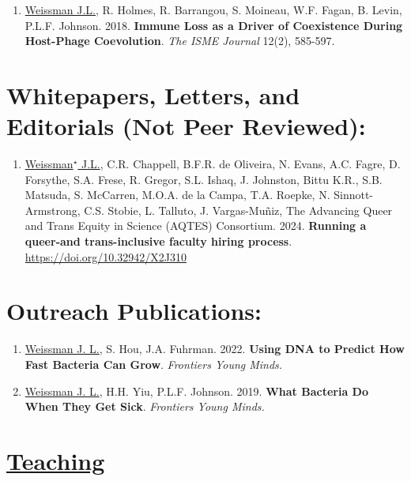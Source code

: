 \documentclass[]{res}
\begin{document}
\begin{resume}
\begin{enumerate}[leftmargin=*]
\item \underline{Weissman J.L.}, R. Holmes, R. Barrangou, S. Moineau, W.F. Fagan, B. Levin, P.L.F. Johnson. 2018. {\bf Immune Loss as a Driver of Coexistence During Host-Phage Coevolution}. \emph{The ISME Journal} 12(2), 585-597. %

\end{enumerate} 

\section{Whitepapers, Letters, and Editorials (Not Peer Reviewed):} \vspace{0mm}

 \begin{enumerate}[leftmargin=*]

\item \underline{Weissman$^\star$ J.L.}, C.R. Chappell, B.F.R. de Oliveira, N. Evans, A.C. Fagre, D. Forsythe, S.A. Frese, R. Gregor, S.L. Ishaq, J. Johnston, Bittu K.R., S.B. Matsuda, S. McCarren, M.O.A. de la Campa, T.A. Roepke, N. Sinnott-Armstrong, C.S. Stobie, L. Talluto, J. Vargas-Muñiz, The Advancing Queer and Trans Equity in Science (AQTES) Consortium. 2024. {\bf Running a queer-and trans-inclusive faculty hiring process}. \url{https://doi.org/10.32942/X2J310}

  \end{enumerate} 
 
\section{Outreach Publications:} \vspace{0mm}

 \begin{enumerate}[leftmargin=*]

\item \underline{Weissman J. L.}, S. Hou, J.A. Fuhrman. 2022. {\bf Using DNA to Predict How Fast Bacteria Can Grow}. \emph{Frontiers Young Minds.}

\item \underline{Weissman J. L.}, H.H. Yiu, P.L.F. Johnson. 2019. {\bf What Bacteria Do When They Get Sick}. \emph{Frontiers Young Minds.}

  \end{enumerate} 


\section{\underline{Teaching}} \vspace{2mm}


\end{resume}
\end{document}
